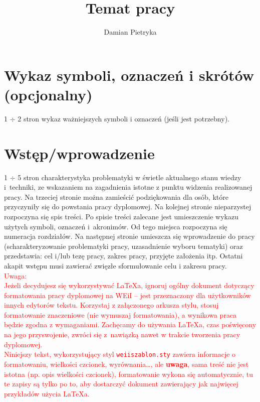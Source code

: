 \documentclass[12pt,twoside]{article}
\author{Damian Pietryka}
\title{Temat pracy}
\begin{document}
\maketitle

\blankpage

\tableofcontents

\clearpage
\blankpage


\section*{Wykaz symboli, oznaczeń i skrótów (opcjonalny)}
%

1 $\div$ 2 stron wykaz ważniejszych symboli i oznaczeń (jeśli jest potrzebny).

\section{Wstęp/wprowadzenie}
1 $\div$ 5 stron charakterystyka problematyki w świetle aktualnego stanu wiedzy i~techniki, ze wskazaniem na zagadnienia istotne z punktu widzenia realizowanej pracy.
Na trzeciej stronie można zamieścić podziękowania dla osób, które przyczyniły się do powstania pracy dyplomowej.
Na kolejnej stronie nieparzystej rozpoczyna się spis treści.
Po spisie treści zalecane jest umieszczenie wykazu użytych symboli, oznaczeń i~akronimów.
Od tego miejsca rozpoczyna się numeracja rozdziałów.
Na następnej stronie umieszcza się wprowadzenie do pracy (scharakteryzowanie problematyki pracy, uzasadnienie wyboru tematyki) oraz przedstawia: cel i/lub tezę pracy, zakres pracy, przyjęte założenia itp.
Ostatni akapit wstępu musi zawierać zwięzłe sformułowanie celu i zakresu pracy. 
\\
\textcolor{red}{
Uwaga: \\
Jeżeli decydujesz się wykorzystywać \LaTeX{}a, ignoruj ogólny dokument dotyczący formatowania pracy dyplomowej na WEiI -- jest przeznaczony dla użytkowników innych edytorów tekstu. Korzystaj z załączonego arkusza stylu, stosuj formatowanie znaczeniowe (nie wymuszaj formatowania), a wynikowa praca będzie zgodna z wymaganiami.
Zachęcamy do używania \LaTeX{}a, czas poświęcony na jego przyswojenie, zwróci się z~nawiązką nawet w trakcie tworzenia pracy dyplomowej. \\
Niniejszy tekst, wykorzystujący  styl \texttt{weiiszablon.sty} zawiera informacje o formatowaniu, wielkości czcionek, wyrównania\ldots, ale \textbf{uwaga}, sama treść nie jest istotna (np. opis wielkości czcionek), 
formatowanie wykona się automatycznie, tu te zapisy są tylko po to, aby dostarczyć dokument zawierający jak najwięcej przykładów użycia \LaTeX{}a.
}
\end{document}
